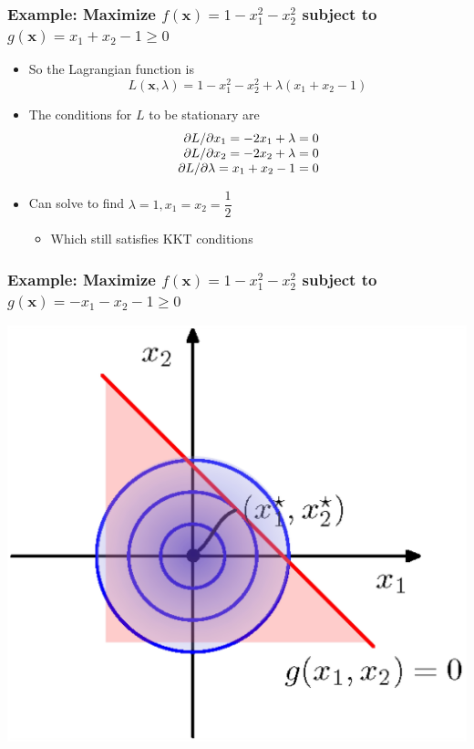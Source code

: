 \documentclass[12pt,notes,mathserif]{beamer}
\begin{document}
\begin{frame}[c]
\frametitle{Example: Maximize $f(\bm{x})=1-x_1^2-x_2^2$ subject to $g(\bm{x})=x_1+x_2-1\geqslant{}0$}
\begin{itemize}
\item So the Lagrangian function is 
\[
L(\bm{x},\lambda)=1-x_1^2-x_2^2+\lambda(x_1+x_2-1)
\]
\item The conditions for $L$ to be stationary are 
\[
\begin{array}{r@{~}l}
\partial L/\partial x_1=-2x_1+\lambda=0\\
\partial L/\partial x_2=-2x_2+\lambda=0\\
\partial L/\partial \lambda=x_1+x_2-1=0\\
\end{array}
\]
\item Can solve to find $\lambda=1,x_1=x_2=\dfrac{1}{2}$
\begin{itemize}
\item Which still satisfies KKT conditions
\end{itemize}
\end{itemize}
\end{frame}


\begin{frame}[c]
\frametitle{Example: Maximize $f(\bm{x})=1-x_1^2-x_2^2$ subject to $g(\bm{x})=-x_1-x_2-1\geqslant{}0$}
\begin{center}
\includegraphics[width=0.65\linewidth]{fig8/lec837.jpg}
\end{center}
\end{frame}
\end{document}
